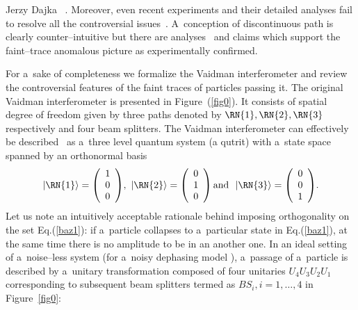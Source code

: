 \begin{artengenv}{Jerzy Dajka}
~\parencite{PhysRevA.91.012103,PhysRevA.93.036103,PhysRevA.93.017801,Vaidman_2018,PhysRevA.92.023829, Hashmi_2016,Hashmi_2018,elitzur}. Moreover, even recent experiments and their detailed analyses fail to resolve all the controversial issues~\parencite{PhysRevLett.111.240402,10.3389/fphy.2015.00047,10.3389/fphy.2015.00048,Sponar_2019,PhysRevA.95.042121,PhysRevA.97.052111, PhysRevA.97.052111,PhysRevA.89.033825,elitzur,WIESNIAK20182565}.  
A~conception of
discontinuous path is clearly counter--intuitive but there are analyses~\parencite{e20110854,PhysRevA.101.052119} and claims which support the faint--trace anomalous picture as experimentally confirmed.  


For a~sake of completeness we formalize the Vaidman interferometer and review the controversial features of the faint traces of particles passing it. The original Vaidman interferometer is presented in Figure~(\ref{fig0}). It consists of spatial degree of freedom given by three paths denoted by $\RN{1},\RN{2},\RN{3}$ respectively and four beam splitters. The Vaidman interferometer can effectively be described~\parencite{PhysRevA.96.022126,PhysRevA.99.026104,PhysRevA.99.026103,scirep} as a~three level quantum system (a qutrit) with a~state space spanned by an orthonormal basis
%
\begin{equation}\label{baz1}
|\RN{1}\rangle=\left(\begin{array}{c} 1 \\ 0 \\ 0   
\end{array}\right)\!,\,\,|\RN{2}\rangle=\left(\begin{array}{c} 0 \\ 1 \\ 0   
\end{array}\right)  \mbox{and}\,\,\,\, |\RN{3}\rangle=\left(\begin{array}{c} 0 \\ 0 \\ 1   
\end{array}\right)\!.
\end{equation}
%
Let us note an intuitively acceptable rationale behind imposing orthogonality on the set Eq.(\ref{baz1}): if a~particle collapses to a~particular state in Eq.(\ref{baz1}), at the same time there is no amplitude to be in an another one.  
%
In an ideal setting of a~noise--less system (for a~noisy dephasing model \parencite[cf.][]{scirep}), a~passage of a~particle is described by a~unitary transformation composed of four unitaries $U_4U_3U_2U_1$ corresponding to subsequent beam splitters termed as $BS_{i}, i=1, \ldots, 4$ in Figure~\ref{fig0}:

\end{artengenv}
